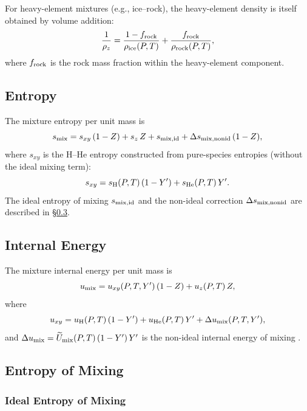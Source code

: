 \documentclass[twocolumn]{aastex701}
\begin{document}
For heavy-element mixtures (e.g., ice--rock), the heavy-element density is itself obtained by volume addition:
\begin{equation}
    \frac{1}{\rho_z} = \frac{1-f_{\rm rock}}{\rho_{\rm ice}(P,T)} + \frac{f_{\rm rock}}{\rho_{\rm rock}(P,T)},
\end{equation}
where $f_{\rm rock}$ is the rock mass fraction within the heavy-element component.

\subsection{Entropy}\label{sec:val_s}

The mixture entropy per unit mass is
\begin{equation}\label{eq:val_s}
    s_{\rm mix} = s_{xy}\,(1-Z) + s_z\,Z + s_{\rm mix,id} + \Delta s_{\rm mix,nonid}\,(1-Z),
\end{equation}
where $s_{xy}$ is the H--He entropy constructed from pure-species entropies (without the ideal mixing term):
\begin{equation}\label{eq:sxy}
    s_{xy} = s_{\rm H}(P,T)\,(1-Y') + s_{\rm He}(P,T)\,Y'.
\end{equation}
The ideal entropy of mixing $s_{\rm mix,id}$ and the non-ideal correction $\Delta s_{\rm mix,nonid}$ are described in \S\ref{sec:smix}.

\subsection{Internal Energy}\label{sec:val_u}

The mixture internal energy per unit mass is
\begin{equation}\label{eq:val_u}
    u_{\rm mix} = u_{xy}(P,T,Y')\,(1-Z) + u_z(P,T)\,Z,
\end{equation}
where
\begin{equation}
    u_{xy} = u_{\rm H}(P,T)\,(1-Y') + u_{\rm He}(P,T)\,Y' + \Delta u_{\rm mix}(P,T,Y'),
\end{equation}
and $\Delta u_{\rm mix} = \widetilde{U}_{\rm mix}(P,T)\,(1-Y')\,Y'$ is the non-ideal internal energy of mixing \citep{Howard2023a}.

\subsection{Entropy of Mixing}\label{sec:smix}

\subsubsection{Ideal Entropy of Mixing}
\end{document}
